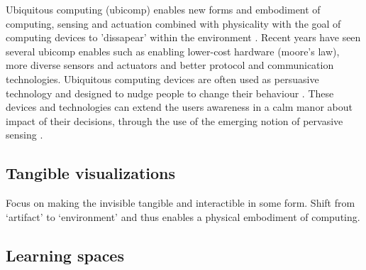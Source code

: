 Ubiquitous computing (ubicomp) enables new forms and embodiment of computing, sensing and actuation combined with physicality with the goal of computing devices to 'dissapear' within the environment \cite{weiser}. Recent years have seen several ubicomp enables such as enabling lower-cost hardware (moore’s law), more diverse sensors and actuators and better protocol and communication technologies. Ubiquitous computing devices are often used as persuasive technology and designed to nudge people to change their behaviour \cite{twinkly}. These devices and technologies can extend the users awareness in a calm manor about impact of their decisions, through the use of the emerging notion of pervasive sensing \cite{calm}.

\subsection{Tangible visualizations}

Focus on making the invisible tangible and interactible in some form. Shift from ‘artifact’ to ‘environment’ and thus enables a physical embodiment of computing.

\subsection{Learning spaces}